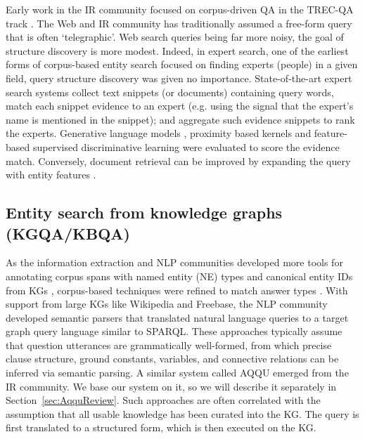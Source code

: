 \documentclass{svjour3}
\begin{document}
Early work in the IR community focused on corpus-driven QA in the TREC-QA track \citep{Wang2006QAsurvey, Cardie2012NLPCourse}.  The Web and IR community has traditionally assumed a free-form query that is often `telegraphic'.  Web search queries being far more noisy, the goal of structure discovery is more modest.  Indeed, in expert search, one of the earliest forms of corpus-based entity search focused on finding experts (people) in a given field, query structure discovery was given no importance.  State-of-the-art expert search systems \citep{BalogAdR2009LanguageModelExpert, MacdonaldO2011RankingAggregates, PetkovaBC2007NamedEntityProximity} collect text snippets (or documents) containing query words, match each snippet evidence to an expert (e.g. using the signal that the expert's name is mentioned in the snippet); and aggregate such evidence snippets to rank the experts.  Generative language models \citep{BalogAR2006ExpertSearch}, proximity based kernels \citep{PetkovaBC2007NamedEntityProximity} and feature-based supervised discriminative learning \citep{FangSM2010DiscriminativeExpertSearch} were evaluated to score the evidence match.  Conversely, document retrieval can be improved by expanding the query with entity features \citep{DaltonDA2014EQFE}.


\subsection{Entity search from knowledge graphs (KGQA/KBQA)}
\label{sec:Rel:KGQA}

As the information extraction and NLP communities developed more tools for annotating corpus spans with named entity (NE) types \citep{LingW2012FineType} and canonical entity IDs from KGs \citep{GaneaH2017DeepNed}, corpus-based techniques were refined to match answer types \citep{MurdockKWFFGZK2012TypeCoercion}.  With support from large KGs like Wikipedia and Freebase, the NLP community developed semantic parsers \citep{BerantCFL2013SEMPRE, YaoVD2014Jacana, YihCHG2015STAGG, KasneciSIRW2008NAGA, PoundHIW2012InterpretQuery, YahyaBERTW2012DEANNA, KwiatkowskiCAZ2013SemPar} that translated natural language queries to a target graph query language similar to SPARQL.  These approaches typically assume that question utterances are grammatically well-formed, from which precise clause structure, ground constants, variables, and connective relations can be inferred via semantic parsing.  A similar system called AQQU \citep{BastH2015aqqu} emerged from the IR community.  We base our system on it, so we will describe it separately in Section~\ref{sec:AqquReview}.  Such approaches are often correlated with the assumption that all usable knowledge has been curated into the KG.  The query is first translated to a structured form, which is then executed on the KG.
\end{document}

